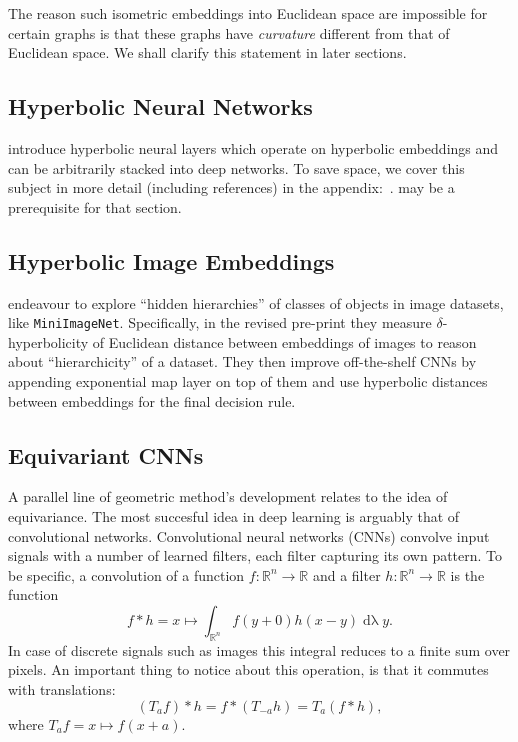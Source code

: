 The reason such isometric embeddings into Euclidean space are impossible for
certain graphs is that these graphs have \emph{curvature} different from that
of Euclidean space. We shall clarify this statement in later sections.

\subsection*{Hyperbolic Neural Networks}

\citet{ganeaHNNs} introduce hyperbolic neural layers which operate on
hyperbolic embeddings and can be arbitrarily stacked into deep networks.  To
save space, we cover this subject in more detail (including references) in the
appendix:~.  may be
a prerequisite for that section.

\subsection*{Hyperbolic Image Embeddings}

\citet{khrulkov} endeavour to explore ``hidden hierarchies'' of classes of
objects in image datasets, like \texttt{MiniImageNet}. Specifically, in the
revised pre-print they measure \( \delta \)-hyperbolicity of Euclidean distance
between embeddings of images to reason about ``hierarchicity'' of a dataset.
They then improve off-the-shelf CNNs by appending exponential map layer on top
of them and use hyperbolic distances between embeddings for the final
decision rule.

\subsection*{Equivariant CNNs}

A parallel line of geometric method's development relates to the idea of
equivariance. The most succesful idea in deep learning is arguably that of
convolutional networks. Convolutional neural networks (CNNs) convolve
input signals with a number of learned filters, each filter capturing
its own pattern. To be specific, a convolution of a function \( f: \mathbb{R}^n
\to \mathbb{R} \) and a filter \( h: \mathbb{R}^n \to \mathbb{R} \) is the
function~\cite{feichtingerFAHA}
\[ f*h = x \mapsto \int_{\mathbb{R}^n} f(y + 0) h(x-y)
\operatorname{d\lambda} y. \]
In case of discrete signals such as images this
integral reduces to a finite sum over pixels. An important thing to notice
about this operation, is that it commutes with translations:
\[ (T_a f) * h = f * (T_{-a} h) = T_a (f * h), \]
where \( T_a f = x \mapsto f(x + a) \).

